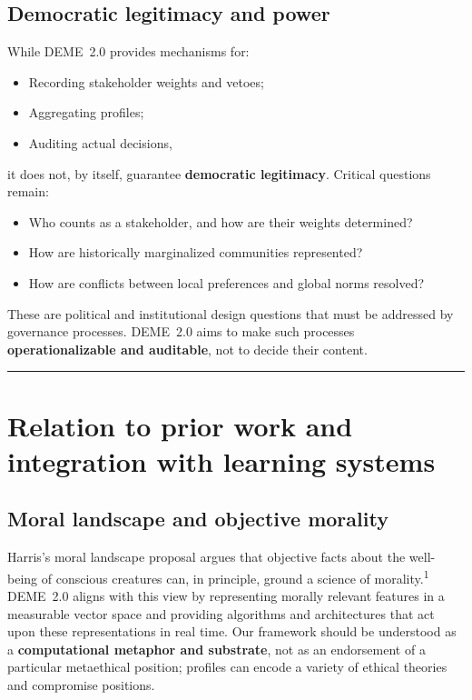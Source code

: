 \documentclass[11pt]{article}
\begin{document}
\subsection{Democratic legitimacy and power}

While DEME~2.0 provides mechanisms for:

\begin{itemize}
  \item Recording stakeholder weights and vetoes;
  \item Aggregating profiles;
  \item Auditing actual decisions,
\end{itemize}

\noindent it does not, by itself, guarantee \textbf{democratic legitimacy}. Critical questions remain:

\begin{itemize}
  \item Who counts as a stakeholder, and how are their weights determined?
  \item How are historically marginalized communities represented?
  \item How are conflicts between local preferences and global norms resolved?
\end{itemize}

These are political and institutional design questions that must be addressed by governance processes. DEME~2.0 aims to make such processes \textbf{operationalizable and auditable}, not to decide their content.

\hrule
\vspace{1em}

\section{Relation to prior work and integration with learning systems}

\subsection{Moral landscape and objective morality}

Harris's moral landscape proposal argues that objective facts about the well-being of conscious creatures can, in principle, ground a science of morality.\textsuperscript{1} DEME~2.0 aligns with this view by representing morally relevant features in a measurable vector space and providing algorithms and architectures that act upon these representations in real time. Our framework should be understood as a \textbf{computational metaphor and substrate}, not as an endorsement of a particular metaethical position; profiles can encode a variety of ethical theories and compromise positions.
\end{document}
